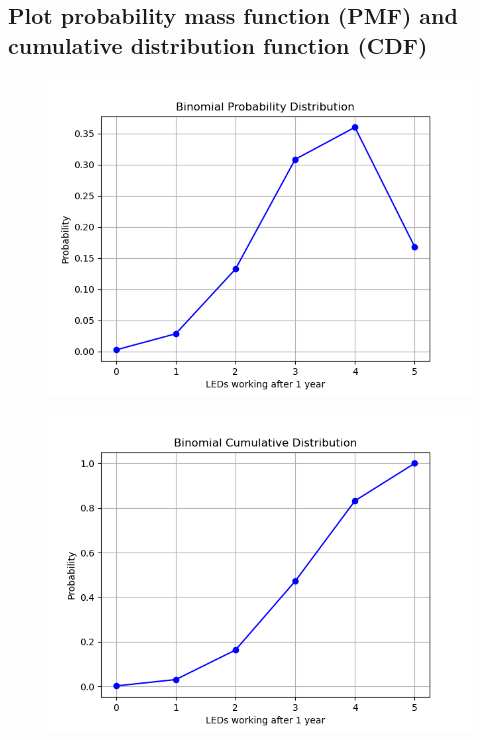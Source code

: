 \documentclass{article}
\begin{document}
\subsection{Plot probability mass function (PMF) and cumulative distribution function (CDF)}
\begin{figure}[h]
    \centering
    \centerline{\includegraphics[scale=0.4]{4_a.png}}
\end{figure}
\begin{figure}[h]
    \centering
    \centerline{\includegraphics[scale=0.4]{4_b.png}}
\end{figure}
\end{document}
